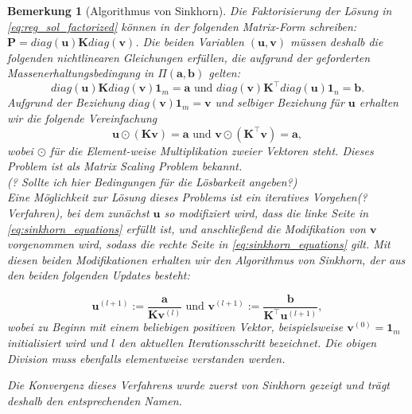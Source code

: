 \documentclass[11pt,a4paper]{article}
\newtheorem{remark}[theorem]{Bemerkung}
\numberwithin{equation}{section}
\begin{document}
	
	\begin{remark}[Algorithmus von Sinkhorn]
		Die Faktorisierung der Lösung in \autoref{eq:reg_sol_factorized} können in der folgenden Matrix-Form schreiben: $\boldsymbol{P} = diag(\boldsymbol{u}) \boldsymbol{K} diag(\boldsymbol{v})$. Die beiden Variablen $(\boldsymbol{u}, \boldsymbol{v})$ müssen deshalb die folgenden nichtlinearen Gleichungen erfüllen, die aufgrund der geforderten Massenerhaltungsbedingung in $\Pi (\boldsymbol{a},\boldsymbol{b})$ gelten:
		\begin{equation}
		diag(\boldsymbol{u}) \boldsymbol{K} diag(\boldsymbol{v})\boldsymbol{1}_m = \boldsymbol{a} \text{ und }
		diag(\boldsymbol{v}) \boldsymbol{K}^\top diag(\boldsymbol{u})\boldsymbol{1}_n = \boldsymbol{b}.
		\end{equation}
		Aufgrund der Beziehung $diag(\boldsymbol{v})\boldsymbol{1}_m =  \boldsymbol{v}$ und selbiger Beziehung für $\boldsymbol{u}$ erhalten wir die folgende Vereinfachung
		\begin{equation}
		\boldsymbol{u} \odot (\boldsymbol{K}\boldsymbol{v}) = \boldsymbol{a} \text{ und }
		\boldsymbol{v} \odot (\boldsymbol{K}^\top \boldsymbol{v}) = \boldsymbol{a}, \label{eq:sinkhorn_equations}
		\end{equation}  
		wobei $\odot$ für die Element-weise Multiplikation zweier Vektoren steht. Dieses Problem ist als \textit{Matrix Scaling Problem} \cite{matrix_scaling} bekannt.\\
		(? Sollte ich hier Bedingungen für die Lösbarkeit angeben?) \\
		Eine Möglichkeit zur Lösung dieses Problems ist ein iteratives Vorgehen(?Verfahren), bei dem zunächst $\boldsymbol{u}$ so modifiziert wird, dass die linke Seite in \autoref{eq:sinkhorn_equations} erfüllt ist, und anschließend die Modifikation von $\boldsymbol{v}$ vorgenommen wird, sodass die rechte Seite in \autoref{eq:sinkhorn_equations} gilt. Mit diesen beiden Modifikationen erhalten wir den Algorithmus von Sinkhorn, der aus den beiden folgenden Updates besteht:
		
		\begin{equation}
		\boldsymbol{u}^{(l+1)}:= \frac{\boldsymbol{a}}{\boldsymbol{K}\boldsymbol{v}^{(l)}} \text{ und }
		\boldsymbol{v}^{(l+1)}:= \frac{\boldsymbol{b}}{\boldsymbol{K}^\top \boldsymbol{u}^{(l+1)}},
		\end{equation} 
		wobei zu Beginn mit einem beliebigen positiven Vektor, beispielsweise $\boldsymbol{v}^{(0)} = \boldsymbol{1}_m$ initialisiert wird und $l$ den aktuellen Iterationsschritt bezeichnet. Die obigen Division muss ebenfalls elementweise verstanden werden.
		
		Die Konvergenz dieses Verfahrens wurde zuerst von Sinkhorn \cite{sinkhorn1964relationship} gezeigt und trägt deshalb den entsprechenden Namen.
	\end{remark}
	
\end{document}

